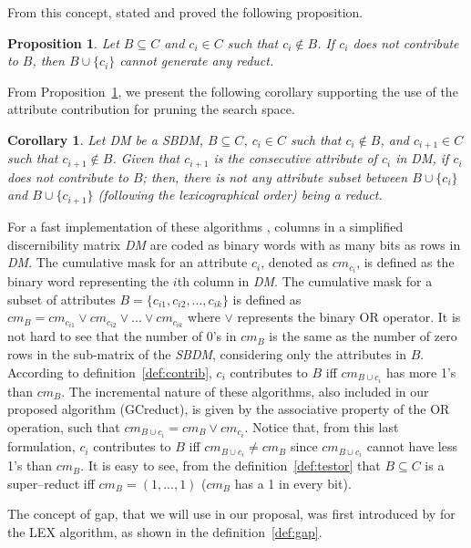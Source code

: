 \documentclass[authoryear,preprint,review,12pt]{elsarticle}
\newtheorem{proposition}{Proposition}
\newtheorem{corollary}{Corollary}
\begin{document}
	From this concept,  \cite{Sanchez07} stated and proved the following proposition.
	
	\begin{proposition}\label{prop:contrib} 
			Let $B \subseteq C$ and  $c_i \in C$ such that $c_i \notin B$. If $c_i$ does not contribute to $B$, then $B\cup\{c_i\}$ cannot generate any reduct.
	\end{proposition}
	
	From Proposition~\ref{prop:contrib}, we present the following corollary supporting the use of the attribute contribution for pruning the search space.
	
	\begin{corollary}\label{coro:contrib} 
		Let DM be a SBDM, $B \subseteq C$,  $c_i \in C$ such that $c_i \notin B$, and $c_{i+1} \in C$ such that $c_{i+1} \notin B$. Given that $c_{i+1}$ is the consecutive attribute of $c_i$ in DM, if $c_i$ does not contribute to $B$; then, there is not any attribute subset between $B\cup\{c_i\}$ and $B\cup\{c_{i+1}\}$ (following the lexicographical order) being a reduct.
	\end{corollary}
		
	For a fast implementation of these algorithms \citep{Sanchez10,Lias13}, columns in a simplified discernibility matrix \textit{DM} are coded as binary words with as many bits as rows in \textit{DM}. The cumulative mask for an attribute $c_i$, denoted as $cm_{c_i}$, is defined as the binary word representing the $i$th column in \textit{DM}. The cumulative mask for a subset of attributes $B=\lbrace c_{i1},c_{i2},...,c_{ik} \rbrace$ is defined	as $cm_B = cm_{c_{i1}} \vee cm_{c_{i2}} \vee ... \vee cm_{c_{ik}}$ where $\vee$ represents the binary OR operator. It is not hard to see that the number of 0's in $cm_B$ is the same as the number of zero rows in the sub-matrix of the \textit{SBDM}, considering only the attributes in $B$. According to definition~\ref{def:contrib}, $c_i$ contributes to $B$ iff $cm_{B\cup c_i}$ has more 1's than $cm_B$. The incremental nature of these algorithms, also included in  our proposed algorithm (GCreduct), is given by the associative property of the OR operation, such that  $cm_{B\cup c_i}=cm_B\vee cm_{c_i}$. Notice that, from this last formulation, $c_i$ contributes to $B$ iff $cm_{B\cup c_i}\neq cm_B$ since $cm_{B\cup c_i}$ cannot have less 1's than $cm_B$. It is easy to see, from the definition~\ref{def:testor} that $B \subseteq C$ is a super--reduct iff $cm_B=(1,...,1)$ ($cm_B$ has a 1 in every bit).

	The concept of gap, that we will use in our proposal, was first introduced by \cite{Santiesteban03} for 
	the LEX algorithm, as shown in the definition~\ref{def:gap}.
	
\end{document}
